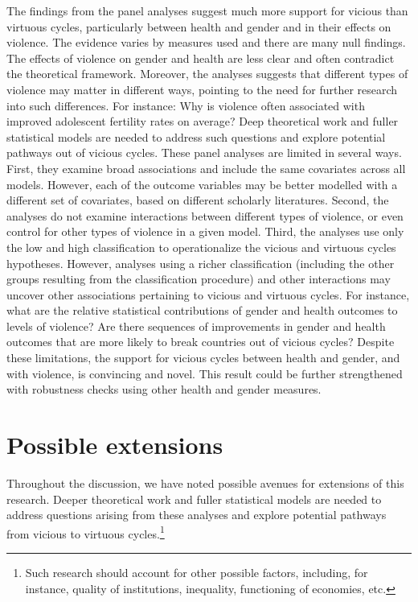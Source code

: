 \documentclass[12pt]{article}
\begin{document}
The findings from the panel analyses suggest much more support for vicious than virtuous cycles, particularly between health and gender and in their effects on violence. The evidence varies by measures used and there are many null findings. The effects of violence on gender and health are less clear and often contradict the theoretical framework. Moreover, the analyses suggests that different types of violence may matter in different ways, pointing to the need for further research into such differences. For instance: Why is violence often associated with improved adolescent fertility rates on average?
Deep theoretical work and fuller statistical models are needed to address such questions and explore potential pathways out of vicious cycles. These panel analyses are limited in several ways. First, they examine broad associations and include the same covariates across all models. However, each of the outcome variables may be better modelled with a different set of covariates, based on different scholarly literatures. Second, the analyses do not examine interactions between different types of violence, or even control for other types of violence in a given model. Third, the analyses use only the low and high classification to operationalize the vicious and virtuous cycles hypotheses. However, analyses using a richer classification (including the other groups resulting from the classification procedure) and other interactions may uncover other associations pertaining to vicious and virtuous cycles. For instance, what are the relative statistical contributions of gender and health outcomes to levels of violence? Are there sequences of improvements in gender and health outcomes that are more likely to break countries out of vicious cycles? Despite these limitations, the support for vicious cycles between health and gender, and with violence, is convincing and novel. This result could be further strengthened with robustness checks using other health and gender measures.

\section{Possible extensions}


Throughout the discussion, we have noted possible avenues for extensions of this research.
Deeper theoretical work and fuller statistical models are needed to address questions arising from these analyses and explore potential pathways from vicious to virtuous cycles.\footnote{Such research should account for other possible factors, including, for instance, quality of institutions, inequality, functioning of economies, etc.}
\end{document}
